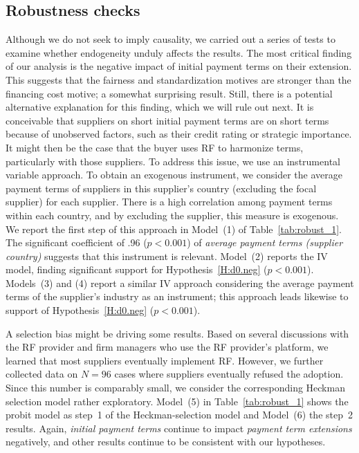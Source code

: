 \documentclass[a4paper,11pt]{article}
\renewcommand{\~}[1]{\tilde{#1}}
\renewcommand{\-}[1]{\overline{#1}}
\begin{document}
\subsection{Robustness checks}
\label{sec:robust}
Although we do not seek to imply causality, we carried out a series of tests to examine whether endogeneity unduly affects the results. The most critical finding of our analysis is the negative impact of initial payment terms on their extension. This suggests that the fairness and standardization motives are stronger than the financing cost motive; a somewhat surprising result. Still, there is a potential alternative explanation for this finding, which we will rule out next. It is conceivable that suppliers on short initial payment terms are on short terms because of unobserved factors, such as their credit rating or strategic importance. It might then be the case that the buyer uses RF to harmonize terms, particularly with those suppliers. To address this issue, we use an instrumental variable approach. To obtain an exogenous instrument, we consider the average payment terms of suppliers in this supplier's country (excluding the focal supplier) for each supplier. There is a high correlation among payment terms within each country, and by excluding the supplier, this measure is exogenous. We report the first step of this approach in Model~(1) of Table~\ref{tab:robust_1}. The significant coefficient of .96 ($p<0.001$) of \textit{average payment terms (supplier country)} suggests that this instrument is relevant. Model~(2) reports the IV model, finding significant support for Hypothesis~\ref{H:d0.neg} ($p<0.001$). Models~(3) and (4) report a similar IV approach considering the average payment terms of the supplier's industry as an instrument; this approach leads likewise to support of Hypothesis~\ref{H:d0.neg} ($p<0.001$). 

A selection bias might be driving some results. Based on several discussions with the RF provider and firm managers who use the RF provider's platform, we learned that most suppliers eventually implement RF. However, we further collected data on $N=96$ cases where suppliers eventually refused the adoption. Since this number is comparably small, we consider the corresponding Heckman selection model rather exploratory. Model~(5) in Table~\ref{tab:robust_1} shows the probit model as step~1 of the Heckman-selection model and Model~(6) the step~2 results. Again, \textit{initial payment terms} continue to impact \textit{payment term extensions} negatively, and other results continue to be consistent with our hypotheses. 
\end{document}
